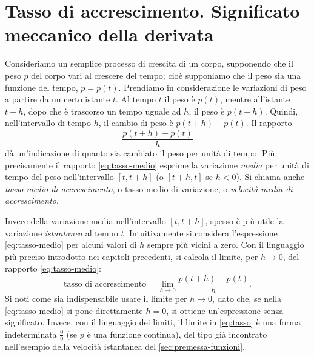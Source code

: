 \section{Tasso di accrescimento. Significato meccanico della derivata}
\label{sec:tasso}

Consideriamo un semplice processo di crescita di un corpo, supponendo che il peso $p$
del corpo vari al crescere del tempo; cioè supponiamo che il peso sia una funzione del
tempo, $p=p(t)$. Prendiamo in considerazione le variazioni di peso a partire da un certo
istante $t$. Al tempo $t$ il peso è $p(t)$, mentre all'istante $t+h$, dopo che è
trascorso un tempo uguale ad $h$, il peso è $p(t+h)$. Quindi, nell'intervallo di tempo
$h$, il cambio di peso è $p(t+h)-p(t)$. Il rapporto
\begin{equation}\label{eq:tasso-medio}
  \frac{p(t+h)-p(t)}{h}
\end{equation}
dà un'indicazione di quanto sia cambiato il peso per unità di tempo. Più precisamente
il rapporto \eqref{eq:tasso-medio} esprime la variazione \emph{media} per unità di tempo
del peso nell'intervallo $[t,t+h]$ (o $[t+h,t]$ se $h<0$). Si chiama anche \emph{tasso
medio di accrescimento}, o tasso medio di variazione, o \emph{velocità media di
accrescimento}.

Invece della variazione media nell'intervallo $[t,t+h]$, spesso è più utile la
variazione \emph{istantanea} al tempo $t$. Intuitivamente si considera l'espressione
\eqref{eq:tasso-medio} per alcuni valori di $h$ sempre più vicini a zero. Con il
linguaggio più preciso introdotto nei capitoli precedenti, si calcola il limite, per
$h\to0$, del rapporto \eqref{eq:tasso-medio}:
\begin{equation}\label{eq:tasso}
  \text{tasso di accrescimento}=\lim_{h\to0}\frac{p(t+h)-p(t)}{h}.
\end{equation}
Si noti come sia indispensabile usare il limite per $h\to0$, dato che, se nella
\eqref{eq:tasso-medio} si pone direttamente $h=0$, si ottiene un'espressione senza
significato. Invece, con il linguaggio dei limiti, il limite in \eqref{eq:tasso} è una
forma indeterminata $\frac00$ (se $p$ è una funzione continua), del tipo già incontrato
nell'esempio della velocità istantanea del \cref{sec:premessa-funzioni}.

